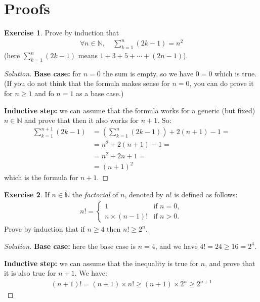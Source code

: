 \documentclass[a4paper,oneside]{article}
\theoremstyle{definition} \newtheorem{exercise}{Exercise}[section]
\begin{document}
\section{Proofs}

\begin{exercise}
  Prove by induction that
  \begin{align*}
    \forall n\in\mathbb N,\quad \sum_{k=1}^n(2k-1)=n^2
  \end{align*}
    (here $\sum_{k=1}^n(2k-1)$ means $1+3+5+\cdots+ (2n-1)$).
\end{exercise}
\begin{proof}[Solution]
  \textbf{Base case:} for $n=0$ the sum is empty, so we have $0=0$ which is
  true. (If you do not think that the formula makes sense for $n=0$, you can do
  prove it for $n\geq 1$ and fo $n=1$ as a base case.)

  \textbf{Inductive step:} we can assume that the formula works for a generic
  (but fixed) $n\in\mathbb N$ and prove that then it also works for $n+1$. So:
  \begin{align*}
    \sum_{k=1}^{n+1}(2k-1)&=\left(\sum_{k=1}^{n}(2k-1)\right)+2(n+1)-1=\\
                          &=n^2 +2(n+1)-1=\\
                          &=n^2+2n+1=\\
                          &=(n+1)^2
  \end{align*}
  which is the formula for $n+1$.
\end{proof}

\begin{exercise}
  If $n\in \mathbb N$ the \emph{factorial} of $n$, denoted by $n!$ is defined
  as follows:
  \begin{align*}
    n!=\begin{cases}
      1&\text{if } n=0,\\
      n\times (n-1)! & \text{if } n> 0.
    \end{cases}
  \end{align*}
  Prove by induction that if $n\geq 4$ then $n!\geq 2^n$.
\end{exercise}
\begin{proof}[Solution]
  \textbf{Base case:} here the base case is $n=4$, and we have
  $4!=24\geq 16=2^4$.

  \textbf{Inductive step:} we can assume that the inequality is true for $n$,
  and prove that it is also true for $n+1$. We have:
  \begin{align*}
    (n+1)!=(n+1)\times n!\geq (n+1)\times 2^n\geq 2^{n+1}
  \end{align*}
\end{proof}
\end{document}

